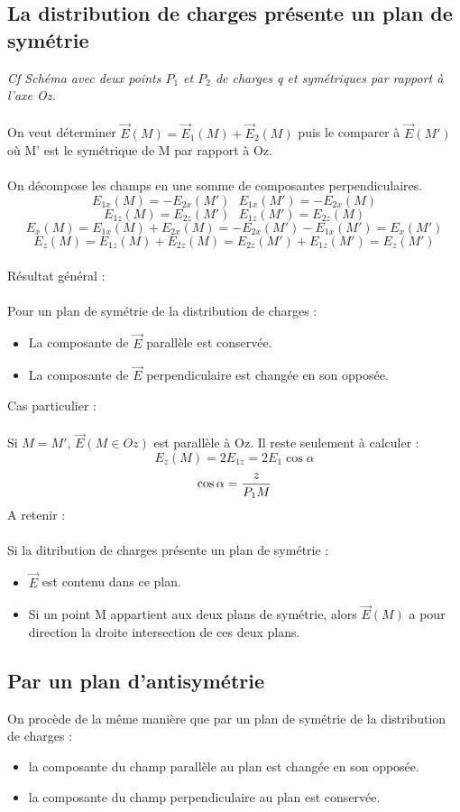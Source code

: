 \documentclass[11pt,a4paper,french]{article}
\begin{document}
\subsection{La distribution de charges présente un plan de symétrie}
\textit{Cf Schéma avec deux points $P_1$ et $P_2$ de charges q et symétriques par rapport à l'axe Oz.}\\ \\
On veut déterminer $\vec E(M) = \vec E_1(M)+\vec E_2(M)$ puis le comparer à $\vec E(M')$ où M' est le symétrique de M par rapport à Oz.\\ \\
On décompose les champs en une somme de composantes perpendiculaires.
$$E_{1x}(M) = -E_{2x}(M') ~~~ E_{1x}(M') = -E_{2x}(M)$$
$$E_{1z}(M) = E_{2z}(M') ~~~ E_{1z}(M') = E_{2z}(M)$$
$$E_x(M) = E_{1x}(M)+E_{2x}(M) = -E_{2x}(M')-E_{1x}(M') = E_x(M')$$
$$E_z(M) = E_{1z}(M)+E_{2z}(M) = E_{2z}(M')+E_{1z}(M') = E_z(M')$$
\\
Résultat général : \\ \\
Pour un plan de symétrie de la distribution de charges : \\
\begin{itemize}
\item La composante de $\vec E$ parallèle est conservée.
\item La composante de $\vec E$ perpendiculaire est changée en son opposée.
\end{itemize}
Cas particulier : \\ \\
Si $M = M'$, $\vec E(M \in Oz)$ est parallèle à Oz. Il reste seulement à calculer : 
$$E_z(M) = 2E_{1z}=2E_1 \cos \alpha$$
$$\cos \alpha = {z \over P_1 M}$$
\newpage
A retenir : \\ \\
Si la ditribution de charges présente un plan de symétrie : 
\begin{itemize}
\item $\vec E$ est contenu dans ce plan.
\item Si un point M appartient aux deux plans de symétrie, alors $\vec E(M)$ a pour direction la droite intersection de ces deux plans.
\end{itemize}
\subsection{Par un plan d'antisymétrie}
On procède de la même manière que par un plan de symétrie de la distribution de charges :
\begin{itemize}
\item la composante du champ parallèle au plan est changée en son opposée.
\item la composante du champ perpendiculaire au plan est conservée.
\end{itemize}
\end{document}
